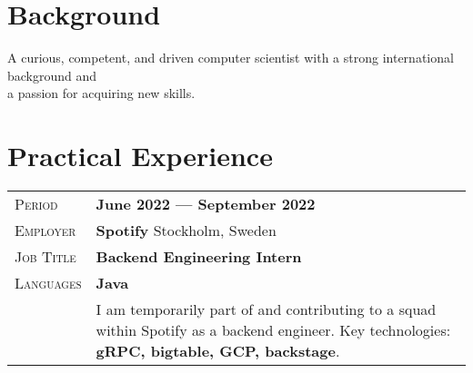 \documentclass[a4paper, oneside, final]{scrartcl} %
\newcommand{\gray}{\rowcolor[gray]{.90}} %
\begin{document}
\begin{center} %


{\fontsize{36}{36}\selectfont\scshape{}} %

\vspace{1.5cm} %


\section{Background}

A curious, competent, and driven computer scientist with a strong international background and \\ a passion for acquiring new skills.


\section{Practical Experience}

\begin{tabularx}{0.97\linewidth}{>{\raggedleft\scshape}p{2cm}X}
\gray Period & \textbf{June 2022 --- September 2022}\\
\gray Employer & \textbf{Spotify} \hfill Stockholm, Sweden\\
\gray Job Title & \textbf{Backend Engineering Intern}\\
\gray Languages & \textbf{Java}\\
       & I am temporarily part of and contributing to a squad within Spotify as a backend engineer. Key technologies: \textbf{gRPC, bigtable, GCP, backstage}.
\end{tabularx}

\vspace{12pt}


\end{center}
\end{document}
